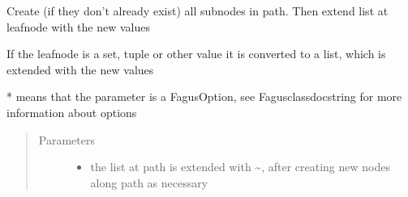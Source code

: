 \documentclass[a4paper,10pt,english]{sphinxmanual}
\begin{document}
\begin{fulllineitems}
\begin{fulllineitems}
\label{\detokenize{fagus:fagus.Fagus.extend}}
\pysigstartsignatures
{}
\pysigstopsignatures
\sphinxAtStartPar
Create (if they don’t already exist) all sub\sphinxhyphen{}nodes in path. Then extend list at leaf\sphinxhyphen{}node with the new values

\sphinxAtStartPar
If the leaf\sphinxhyphen{}node is a set, tuple or other value it is converted to a list, which is extended with the new values

\sphinxAtStartPar
* means that the parameter is a FagusOption, see Fagus\sphinxhyphen{}class\sphinxhyphen{}docstring for more information about options
\begin{quote}\begin{description}
\item[{Parameters}] \leavevmode\begin{itemize}
\item {}
\sphinxAtStartPar
{} \textendash{} the list at path is extended with \textasciitilde{}, after creating new nodes along path as necessary


\end{itemize}
\end{description}
\end{quote}
\end{fulllineitems}
\end{fulllineitems}
\end{document}
